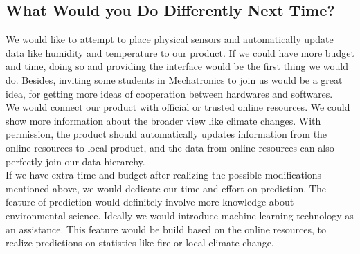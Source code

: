 \documentclass{article}
\begin{document}
\subsection{What Would you Do Differently Next Time?}


\noindent We would like to attempt to place physical sensors and automatically update data like humidity and temperature to our product. If we could have more budget and time, doing so and providing the interface would be the first thing we would do. Besides, inviting some students in Mechatronics to join us would be a great idea, for getting more ideas of cooperation between hardwares and softwares. \\

\noindent We would connect our product with official or trusted online resources. We could show more information about the broader view like climate changes. With permission, the product should automatically updates information from the online resources to local product, and the data from online resources can also perfectly join our data hierarchy. \\

\noindent If we have extra time and budget after realizing the possible modifications mentioned above, we would dedicate our time and effort on prediction. The feature of prediction would definitely involve more knowledge about environmental science. Ideally we would introduce machine learning technology as an assistance. This feature would be build based on the online resources, to realize predictions on statistics like fire or local climate change.
\end{document}
